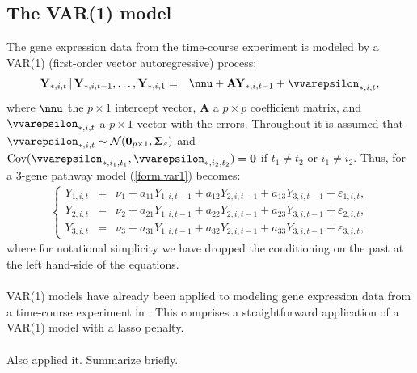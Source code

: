 \documentclass[a4paper]{article}
\theoremstyle{myexamplestyle}
\begin{document}
\subsection{The VAR(1) model}
The gene expression data from the time-course experiment is modeled by a VAR(1) (first-order vector autoregressive) process:
\begin{eqnarray} \label{form.var1}
\mathbf{Y}_{\ast, i, t} \, | \, \mathbf{Y}_{\ast, i,t-1}, \ldots,  \mathbf{Y}_{\ast, i, 1} & = & \nnu + \mathbf{A} \mathbf{Y}_{\ast, i, t-1} + \vvarepsilon_{\ast, i, t},
\end{eqnarray}
where $\nnu$ the $p \times 1$ intercept vector, $\mathbf{A}$ a $p \times p$ coefficient matrix, and $\vvarepsilon_{\ast,i,t}$ a $p \times 1$ vector with the errors. Throughout it is assumed that $\vvarepsilon_{\ast,i,t} \sim \mathcal{N}(\mathbf{0}_{p \times 1}, \mathbf{\Sigma}_{\varepsilon})$ and $\mbox{Cov}(\vvarepsilon_{\ast,i_1,t_1}, \vvarepsilon_{\ast,i_2,t_2}) = \mathbf{0}$ if $t_1 \not=t_2$ or $i_1 \not=i_2$. Thus, for a 3-gene pathway model (\ref{form.var1}) becomes:
\begin{eqnarray*}
\left\{
\begin{array}{ccc}
Y_{1,i,t} & = & \nu_1 + a_{11} Y_{1,i,t-1} + a_{12} Y_{2,i,t-1} + a_{13} Y_{3,i,t-1} + \varepsilon_{1,i,t},
\\
Y_{2,i,t} & = & \nu_2 + a_{21} Y_{1,i,t-1} + a_{22} Y_{2,i,t-1} + a_{23} Y_{3,i,t-1} + \varepsilon_{2,i,t},
\\
Y_{3,i,t} & = & \nu_3 + a_{31} Y_{1,i,t-1} + a_{32} Y_{2,i,t-1} + a_{33} Y_{3,i,t-1} + \varepsilon_{3,i,t},
\end{array}
\right.
\end{eqnarray*}
where for notational simplicity we have dropped the conditioning on the past at the left hand-side of the equations.
\\
\\
VAR(1) models have already been applied to modeling gene expression data from a time-course experiment in \cite{Fuji2007}. This comprises a straightforward application of a VAR(1) model with a lasso penalty.
\\
\\
Also \cite{Abeg2013} applied it. Summarize briefly.
\end{document}
